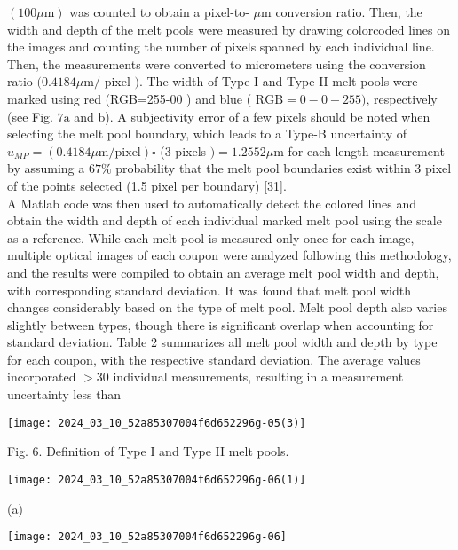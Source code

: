 \documentclass[10pt]{article}
\begin{document}
$(100 \mu \mathrm{m})$ was counted to obtain a pixel-to- $\mu \mathrm{m}$ conversion ratio. Then, the width and depth of the melt pools were measured by drawing colorcoded lines on the images and counting the number of pixels spanned by each individual line. Then, the measurements were converted to micrometers using the conversion ratio $(0.4184 \mu \mathrm{m} /$ pixel $)$. The width of Type I and Type II melt pools were marked using red (RGB=255-00 ) and blue ( $\mathrm{RGB}=0-0-255)$, respectively (see Fig. $7 \mathrm{a}$ and b). A subjectivity error of a few pixels should be noted when selecting the melt pool boundary, which leads to a Type-B uncertainty of $u_{M P}=(0.4184 \mu \mathrm{m} / \mathrm{pixel}) \square$ (3 pixels $)=1.2552 \mu \mathrm{m}$ for each length measurement by assuming a $67 \%$ probability that the melt pool boundaries exist within 3 pixel of the points selected (1.5 pixel per boundary) [31].\\
A Matlab code was then used to automatically detect the colored lines and obtain the width and depth of each individual marked melt pool using the scale as a reference. While each melt pool is measured only once for each image, multiple optical images of each coupon were analyzed following this methodology, and the results were compiled to obtain an average melt pool width and depth, with corresponding standard deviation. It was found that melt pool width changes considerably based on the type of melt pool. Melt pool depth also varies slightly between types, though there is significant overlap when accounting for standard deviation. Table 2 summarizes all melt pool width and depth by type for each coupon, with the respective standard deviation. The average values incorporated $>30$ individual measurements, resulting in a measurement uncertainty less than

\begin{center}
\texttt{[image: 2024\_03\_10\_52a85307004f6d652296g-05(3)]}
\end{center}

Fig. 6. Definition of Type I and Type II melt pools.

\begin{center}
\texttt{[image: 2024\_03\_10\_52a85307004f6d652296g-06(1)]}
\end{center}

(a)

\begin{center}
\texttt{[image: 2024\_03\_10\_52a85307004f6d652296g-06]}
\end{center}
\end{document}
